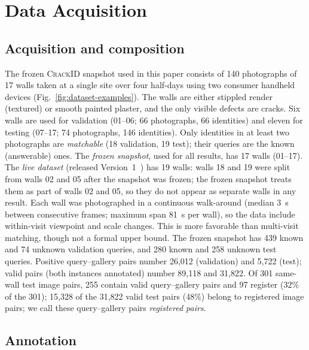 \section{Data Acquisition}
\label{sec:dataset}

\subsection{Acquisition and composition}
\label{sec:acquisition}

The frozen \textsc{CrackID} snapshot used in this paper consists of 140 photographs of 17 walls taken at a single site over four half-days using two consumer handheld devices (Fig.~\ref{fig:dataset-examples}).
The walls are either stippled render (textured) or smooth painted plaster, and the only visible defects are cracks.
Six walls are used for validation (01--06; 66 photographs, 66 identities) and eleven for testing (07--17; 74 photographs, 146 identities).
Only identities in at least two photographs are \emph{matchable} (18 validation, 19 test); their queries are the known (answerable) ones.
The \emph{frozen snapshot}, used for all results, has 17 walls (01--17). The \emph{live dataset} (released Version~1~\cite{ferramenta2026crackid}) has 19 walls: walls 18 and 19 were split from walls 02 and 05 after the snapshot was frozen; the frozen snapshot treats them as part of walls 02 and 05, so they do not appear as separate walls in any result.
Each wall was photographed in a continuous walk-around (median 3~s between consecutive frames; maximum span 81~s per wall), so the data include within-visit viewpoint and scale changes.
This is more favorable than multi-visit matching, though not a formal upper bound.
The frozen snapshot has 439 known and 74 unknown validation queries, and 280 known and 258 unknown test queries. Positive query--gallery pairs number 26,012 (validation) and 5,722 (test); valid pairs (both instances annotated) number 89,118 and 31,822.
Of 301 same-wall test image pairs, 255 contain valid query--gallery pairs and 97 register (32\% of the 301); 15,328 of the 31,822 valid test pairs (48\%) belong to registered image pairs; we call these query--gallery pairs \emph{registered pairs}.

\subsection{Annotation}
\label{sec:annotation}


